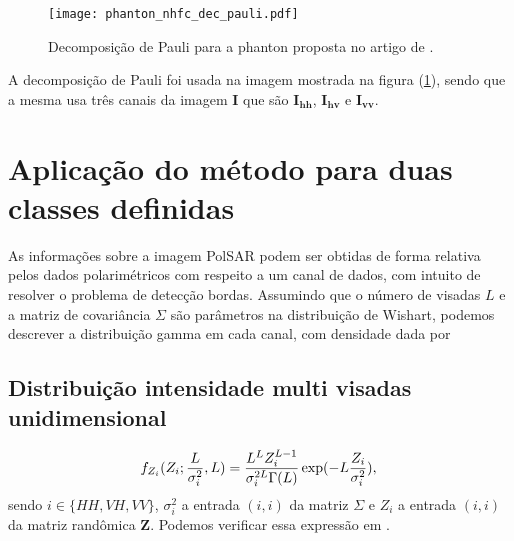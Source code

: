 \begin{figure}[hbt]
\centering
	\texttt{[image: phanton\_nhfc\_dec\_pauli.pdf]}
	\caption{Decomposição de Pauli para a phanton proposta no artigo de \citet{nhfc}.}\label{cap_acf_fig01}
\end{figure}
A decomposição de Pauli foi usada na imagem mostrada na figura (\ref{cap_acf_fig01}), sendo que a mesma usa três canais da imagem \textbf{I} que são $\mathbf{I_{hh}}$, $\mathbf{I_{hv}}$ e $\mathbf{I_{vv}}$. 
	
\section{Aplicação do método  para duas classes definidas}

As informações sobre a imagem PolSAR podem ser obtidas de forma relativa pelos dados polarimétricos com respeito a um canal de dados, com intuito de resolver o problema de detecção bordas. Assumindo que o número de visadas $L$ e a matriz de covariância  $\Sigma$ são parâmetros na distribuição de Wishart, podemos descrever a distribuição gamma em cada canal, com densidade dada por 
\subsection{Distribuição intensidade multi visadas unidimensional }
\begin{equation}\label{cap_acf_23}
	f_{Z_{i}}(Z_{i};\frac{L}{\sigma_{i}^2},L)=\frac{L^{L}Z_{i}^{L-1}}{\sigma_{i}^{2L}\Gamma(L)} \exp(-L\frac{Z_{i}}{\sigma_{i}^2}), \\
\end{equation}
sendo $i\in \{HH, VH, VV\}$, $\sigma_{i}^2$ a entrada $(i,i)$ da matriz $\Sigma$ e $Z_{i}$ a entrada $(i,i)$ da matriz randômica $\mathbf{Z}$. Podemos verificar essa expressão em \citep{fnc, nhfc, hsbmp}.	 


